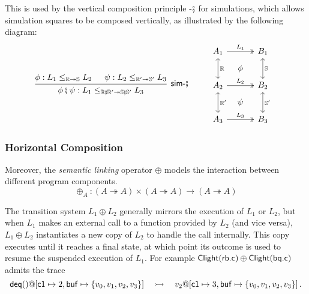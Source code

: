 This is used by the vertical composition principle -$\fatsemi$ for simulations,
which allows simulation squares to be composed vertically,
as illustrated by the following diagram:
\[
  \begin{prooftree}
    \hypo{\phi: L_1 \le_{\mathbb{R} \twoheadrightarrow \mathbb{S}} L_2}
    \hypo{\psi: L_2 \le_{\mathbb{R'} \twoheadrightarrow \mathbb{S'}} L_3}
    \infer2[\kw{sim}-$\fatsemi$]
    {\phi \fatsemi \psi: L_1 \le_{
        \mathbb{R} \fatsemi \mathbb{R'}
      \twoheadrightarrow \mathbb{S} \fatsemi \mathbb{S'}}
    L_3}
  \end{prooftree}
  \qquad
  \begin{array}{c}
    \begin{tikzcd}[row sep=1ex, column sep=2ex]
      A_1 \ar[rr, twoheadrightarrow, "L_1"]
      \ar[dd, leftrightarrow, "\mathbb{R}"]
      && B_1
      \ar[dd, leftrightarrow, "\mathbb{S}"]
      \\
      & \phi &
      \\
      A_2 \ar[rr, twoheadrightarrow, "L_2"]
      \ar[dd, leftrightarrow, "\mathbb{R'}"]
      && B_2
      \ar[dd, leftrightarrow, "\mathbb{S'}"]
      \\
      & \psi &
      \\
      A_3 \ar[rr, twoheadrightarrow, "L_3"] && B_3
    \end{tikzcd}
  \end{array}
\]

\subsubsection{Horizontal Composition}
\label{bg:compcerto:linking}
Moreover,
the \emph{semantic linking} operator $\oplus$
models the interaction between different program components.
\[
  \oplus_A : (A \twoheadrightarrow A) \times
  (A \twoheadrightarrow A) \rightarrow
  (A \twoheadrightarrow A)
\]

The transition system $L_1 \oplus L_2$
generally mirrors the execution of $L_1$ or $L_2$,
but when $L_1$ makes an external call
to a function provided by $L_2$ (and vice versa),
$L_1 \oplus L_2$ instantiates a new copy of $L_2$ to handle the call internally.
This copy executes until it reaches a final state,
at which point its outcome is used to resume
the suspended execution of $L_1$.
For example
$ \mathsf{Clight} ( \mathsf{rb.c} ) \oplus  \mathsf{Clight} ( \mathsf{bq.c} )$
admits the trace
\[
   \mathsf{deq} ()@[ \mathsf{c1}  \mapsto 2,  \mathsf{buf}  \mapsto \{v_0, v_1, v_2, v_3\}]
  \quad\rightarrowtail\quad
  v_2@[ \mathsf{c1}  \mapsto 3,  \mathsf{buf}  \mapsto \{v_0, v_1, v_2, v_3\}]
  \,.
\]

